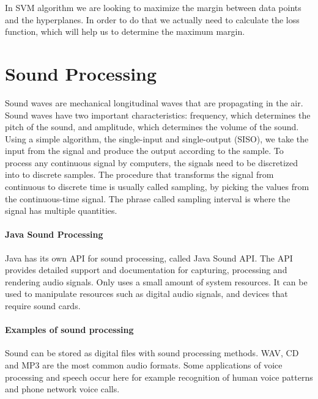 \documentclass[english,12pt,oneside,a4paper]{article}
\begin{document}
		In SVM algorithm we are looking to maximize the margin between data points and the hyperplanes. In order to do that we actually need to calculate the loss function, which will help us to determine the maximum margin.
		
		\section{Sound Processing}
		Sound waves are mechanical longitudinal waves that are propagating in the air. Sound waves have two important characteristics: frequency, which determines the pitch of the sound, and amplitude, which determines the volume of the sound. Using a simple algorithm, the single-input and single-output (SISO), we take the input from the signal and produce the output according to the sample. To process any continuous signal by computers, the signals need to be discretized into to discrete samples. The procedure that transforms the signal from continuous to discrete time is usually called sampling, by picking the values from the continuous-time signal. The phrase called sampling interval is where the signal has multiple quantities.
		\paragraph{Java Sound Processing} Java has its own API for sound processing, called Java Sound API. The API provides detailed support and documentation for capturing, processing and rendering audio signals. Only uses a small amount of system resources. It can be used to manipulate resources such as digital audio signals, and devices that require sound cards.
		\paragraph{Examples of sound processing} Sound can be stored as digital files with sound processing methods. WAV, CD and MP3 are the most common audio formats. Some applications of voice processing and speech occur here for example recognition of human voice patterns and phone network voice calls.
\end{document}
